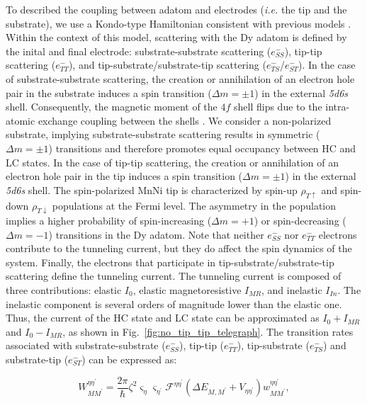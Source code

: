 \documentclass[
reprint,amsmath,amssymb,aps]{revtex4-2}
\begin{document}
To described the coupling between adatom and electrodes (\textit{i.e.} the tip and the substrate), we use a Kondo-type Hamiltonian consistent with previous models \cite{anderson1966,schrieffer1966,appelbaum1967,delgado2010,loth2010,Ternes2015}. Within the context of this model, scattering with the Dy adatom is defined by the inital and final electrode: substrate-substrate scattering ($e^{-}_{SS}$), tip-tip scattering ($e^{-}_{TT}$), and tip-substrate/substrate-tip scattering ($e^{-}_{TS}$/$e^{-}_{ST}$). In the case of substrate-substrate scattering, the creation or annihilation of an electron hole pair in the substrate induces a spin transition ($\Delta m=\pm 1$) in the external \textit{5d6s} shell. Consequently, the magnetic moment of the $4f$ shell flips due to the intra-atomic exchange coupling between the shells \cite{pivetta2020}. We consider a non-polarized substrate, implying substrate-substrate scattering results in symmetric ($\Delta m=\pm 1$) transitions and therefore promotes equal occupancy between HC and LC states. In the case of tip-tip scattering, the creation or annihilation of an electron hole pair in the tip induces a spin transition ($\Delta m=\pm 1$) in the external \textit{5d6s} shell. The spin-polarized MnNi tip is characterized by spin-up $\rho_{T\uparrow}$ and spin-down $\rho_{T\downarrow}$ populations at the Fermi level. The asymmetry in the population implies a higher probability of spin-increasing ($\Delta m=+1$) or spin-decreasing ($\Delta m=-1$) transitions in the Dy adatom. Note that neither $e^{-}_{SS}$ nor $e^{-}_{TT}$ electrons contribute to the tunneling current, but they do affect the spin dynamics of the system. Finally, the electrons that participate in tip-substrate/substrate-tip scattering define the tunneling current. The tunneling current is composed of three contributions: elastic $I_0$, elastic magnetoresistive $I_{MR}$, and inelastic $I_{In}$. The inelastic component is several orders of magnitude lower than the elastic one. Thus, the current of the HC state and LC state can be approximated as $I_0+I_{MR}$ and $I_0-I_{MR}$, as shown in Fig.~\ref{fig:no_tip_tip_telegraph}. The transition rates associated with substrate-substrate ($e^{-}_{SS}$), tip-tip ($e^{-}_{TT}$), tip-substrate ($e^{-}_{TS}$) and substrate-tip ($e^{-}_{ST}$) can be expressed as:

\begin{equation}
    W_{MM^{\prime}}^{\eta \eta^{\prime}}=\dfrac{2\pi}{\hbar} \zeta^2 \varsigma_{\eta} \varsigma_{\eta^{\prime}} \mathcal{F}^{\eta\eta^{\prime}}(\Delta E_{M,M^{\prime}}+V_{\eta \eta^{\prime}} )  w_{MM^{\prime}}^{\eta \eta^{\prime}},
    \label{eq:elec_rates}
\end{equation}
\end{document}
